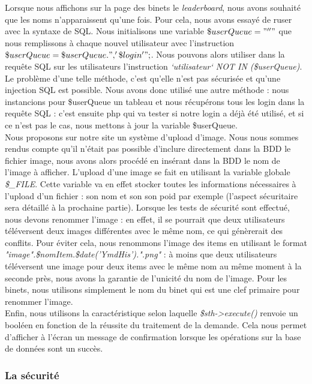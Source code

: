 \documentclass[titlepage,11pt,a4paper]{article}
\begin{document}
Lorsque nous affichons sur la page des binets le \emph{leaderboard}, nous avons souhaité que les noms n'apparaissent qu'une fois. Pour cela, nous avons essayé de ruser avec la syntaxe de SQL. Nous initialisons une variable $\$userQueue="''"$ que nous remplissons à chaque nouvel utilisateur avec l'instruction $\$userQueue=\$userQueue.", '\$login'";$. Nous pouvons alors utiliser dans la requête SQL sur les utilisateurs l'instruction \emph{`utilisateur` NOT IN (\$userQueue)}. Le problème d'une telle méthode, c'est qu'elle n'est pas sécurisée et qu'une injection SQL est possible. Nous avons donc utilisé une autre méthode : nous instancions pour \$userQueue un tableau et nous récupérons tous les login dans la requête SQL : c'est ensuite php qui va tester si notre login a déjà été utilisé, et si ce n'est pas le cas, nous mettons à jour la variable \$userQueue.\\

Nous proposons sur notre site un système d'upload d'image. Nous nous sommes rendus compte qu'il n'était pas possible d'inclure directement dans la BDD le fichier image, nous avons alors procédé en insérant dans la BDD le nom de l'image à afficher. L'upload d'une image se fait en utilisant la variable globale \emph{\$\_FILE}. Cette variable va en effet stocker toutes les informations nécessaires à l'upload d'un fichier : son nom et son son poid par exemple (l'aspect sécuritaire sera détaillé à la prochaine partie). Lorsque les tests de sécurité sont effectué, nous devons renommer l'image : en effet, il se pourrait que deux utilisateurs téléversent deux images différentes avec le même nom, ce qui génèrerait des conflits. Pour éviter cela, nous renommons l'image des items en utilisant le format \emph{"image".\$nomItem.\$date('YmdHis').".png"} : à moins que deux utilisateurs téléversent une image pour deux items avec le même nom au même moment à la seconde près, nous avons la garantie de l'unicité du nom de l'image. Pour les binets, nous utilisons simplement le nom du binet qui est une clef primaire pour renommer l'image.\\

Enfin, nous utilisons la caractéristique selon laquelle \emph{\$sth->execute()} renvoie un booléen en fonction de la réussite du traitement de la demande. Cela nous permet d'afficher à l'écran un message de confirmation lorsque les opérations sur la base de données sont un succès.



\subsubsection{La sécurité}
\end{document}
